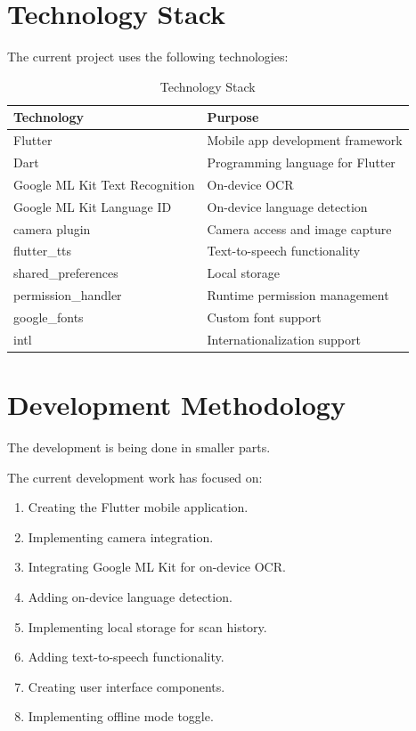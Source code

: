 \documentclass[12pt,a4paper]{report}
\begin{document}
\section{Technology Stack}

The current project uses the following technologies:

\begin{table}[H]
\centering
\caption{Technology Stack}
\begin{tabular}{|p{4cm}|p{7cm}|}
\hline
\textbf{Technology} & \textbf{Purpose} \\ \hline
Flutter & Mobile app development framework \\ \hline
Dart & Programming language for Flutter \\ \hline
Google ML Kit Text Recognition & On-device OCR \\ \hline
Google ML Kit Language ID & On-device language detection \\ \hline
camera plugin & Camera access and image capture \\ \hline
flutter\_tts & Text-to-speech functionality \\ \hline
shared\_preferences & Local storage \\ \hline
permission\_handler & Runtime permission management \\ \hline
google\_fonts & Custom font support \\ \hline
intl & Internationalization support \\ \hline
\end{tabular}
\end{table}

\section{Development Methodology}

The development is being done in smaller parts.

The current development work has focused on:

\begin{enumerate}
    \item Creating the Flutter mobile application.
    \item Implementing camera integration.
    \item Integrating Google ML Kit for on-device OCR.
    \item Adding on-device language detection.
    \item Implementing local storage for scan history.
    \item Adding text-to-speech functionality.
    \item Creating user interface components.
    \item Implementing offline mode toggle.
\end{enumerate}
\end{document}
